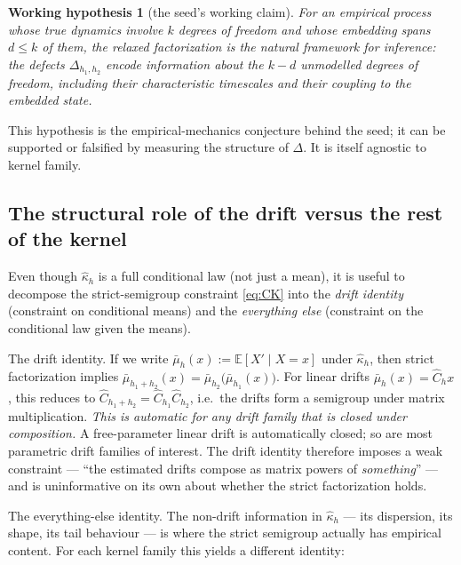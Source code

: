 \documentclass[11pt]{article}
\newcommand{\E}{\mathbb{E}}
\newcommand{\defect}{\Delta}
\theoremstyle{definition}
\theoremstyle{plain}
\newtheorem*{hypothesis}{Working hypothesis}
\begin{document}
\begin{hypothesis}[the seed's working claim]
\label{hyp:working}
For an empirical process whose true dynamics involve $k$ degrees
of freedom and whose embedding spans $d \leq k$ of them, the
relaxed factorization is the natural framework for inference: the
defects $\defect_{h_1, h_2}$ encode information about the $k - d$
unmodelled degrees of freedom, including their characteristic
timescales and their coupling to the embedded state.
\end{hypothesis}

This hypothesis is the empirical-mechanics conjecture behind the
seed; it can be supported or falsified by measuring the structure
of $\defect$. It is itself agnostic to kernel family.

\subsection{The structural role of the drift versus the rest of the kernel}
\label{sec:drift-vs-rest}

Even though $\hat\kappa_h$ is a full conditional law (not just a
mean), it is useful to decompose the strict-semigroup constraint
\eqref{eq:CK} into the \emph{drift identity} (constraint on
conditional means) and the \emph{everything else} (constraint on
the conditional law given the means).

The drift identity. If we write $\bar\mu_h(x) := \E[X' \mid X = x]$
under $\hat\kappa_h$, then strict factorization implies
$\bar\mu_{h_1 + h_2}(x) = \bar\mu_{h_2}\!\bigl(\bar\mu_{h_1}(x)\bigr)$.
For linear drifts $\bar\mu_h(x) = \hat C_h x$, this reduces to
$\hat C_{h_1 + h_2} = \hat C_{h_1} \hat C_{h_2}$, i.e.\ the drifts
form a semigroup under matrix multiplication. \emph{This is
automatic for any drift family that is closed under composition.}
A free-parameter linear drift is automatically closed; so are most
parametric drift families of interest. The drift identity therefore
imposes a weak constraint --- ``the estimated drifts compose as
matrix powers of \emph{something}'' --- and is uninformative on its
own about whether the strict factorization holds.

The everything-else identity. The non-drift information in $\hat\kappa_h$
--- its dispersion, its shape, its tail behaviour --- is where the
strict semigroup actually has empirical content. For each kernel
family this yields a different identity:
\end{document}
